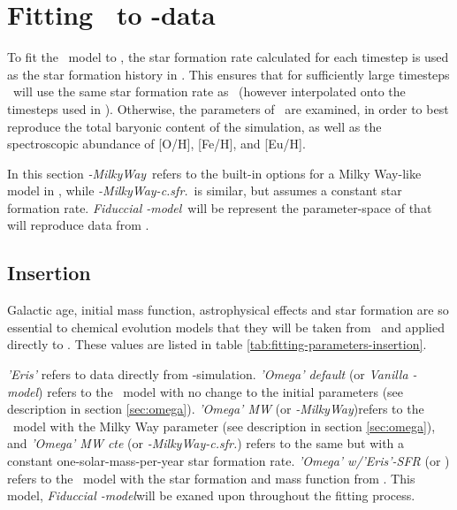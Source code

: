 \section{Fitting \omegamodel\ to \eris-data}
\setlength{}
\newcommand\mwomega{\textit{\omegamodel-MilkyWay}}
\newcommand\mwcomega{\textit{\omegamodel-MilkyWay-c.sfr.}}
\newcommand\vanillaomega{\textit{Vanilla \omegamodel-model}}
\newcommand\fiduccialomega{\textit{Fiduccial \omegamodel-model}}

To fit the \omegamodel\ model to \eris, the star formation rate calculated for each timestep is used as the star formation history in \omegamodel.
This ensures that for sufficiently large timesteps \omegamodel\ will use the same star formation rate as \eris\ (however interpolated onto the timesteps used in \omegamodel).
Otherwise, the parameters of \omegamodel\ are examined, in order to best reproduce the total baryonic content of the simulation, as well as the spectroscopic abundance of [O/H], [Fe/H], and [Eu/H].

In this section \mwomega\ refers to the built-in options for a Milky Way-like model in \omegamodel, while \mwcomega\ is similar, but assumes a constant star formation rate. \fiduccialomega\ will be represent the parameter-space of \omegamodel that will reproduce data from \eris.

\subsection{Insertion}
\newcommand\insertion{insertion}
Galactic age, initial mass function, astrophysical effects and star formation are so essential to chemical evolution models that they will be taken from \eris\ and applied directly to \omegamodel.
These values are listed in table \ref{tab:fitting-parameters-insertion}.

\textit{'Eris'} refers to data directly from \eris-simulation. \textit{'Omega' default} (or \vanillaomega) refers to the \omegamodel\ model with no change to the initial parameters (see description in section \ref{sec:omega}). \textit{'Omega' MW} (or \mwomega)refers to the \omegamodel\ model with the Milky Way parameter (see description in section \ref{sec:omega}), and \textit{'Omega' MW cte} (or \mwcomega) refers to the same but with a constant one-solar-mass-per-year star formation rate. \textit{'Omega' w/'Eris'-SFR} (or \fidducialomega) refers to the \omegamodel\ model with the star formation and mass function from \eris. This model, \fiduccialomega will be exaned upon throughout the fitting process.

